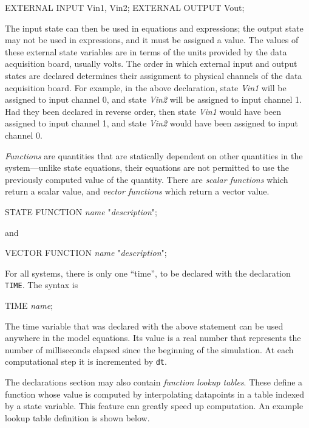 \begin{example}
        EXTERNAL INPUT Vin1, Vin2;
        EXTERNAL OUTPUT Vout;
\end{example}

The input state can then be used in equations and expressions; the
output state may not be used in expressions, and it must be assigned a
value.  The values of these external state variables are in terms of
the units provided by the data acquisition board, usually volts. The
order in which external input and output states are declared
determines their assignment to physical channels of the data
acquisition board.  For example, in the above declaration, state
\emph{Vin1} will be assigned to input channel 0, and state \emph{Vin2}
will be assigned to input channel 1. Had they been declared in reverse
order, then state \emph{Vin1} would have been assigned to input channel
1, and state \emph{Vin2} would have been assigned to input channel 0.

\emph{Functions} are quantities that are statically dependent on other
quantities in the system---unlike state equations, their equations are
not permitted to use the previously computed value of the
quantity. There are \emph{scalar functions} which return a scalar
value, and \emph{vector functions} which return a vector value.

\begin{example}
        STATE FUNCTION \emph{name} "\emph{description}";
\end{example}

and

\begin{example}
        VECTOR FUNCTION \emph{name} "\emph{description}";
\end{example}

For all systems, there is only one ``time'', to be declared with the
declaration \texttt{TIME}. The syntax is

\begin{example}
        TIME \emph{name};
\end{example}

The time variable that was declared with the above statement can be
used anywhere in the model equations. Its value is a real number that
represents the number of milliseconds elapsed since the beginning of
the simulation. At each computational step it is incremented by
\texttt{dt}.

The declarations section may also contain \emph{function lookup tables}.
These define a function whose value is computed by interpolating
datapoints in a table indexed by a state variable.  This feature can
greatly speed up computation.  An example lookup table definition is
shown below.

